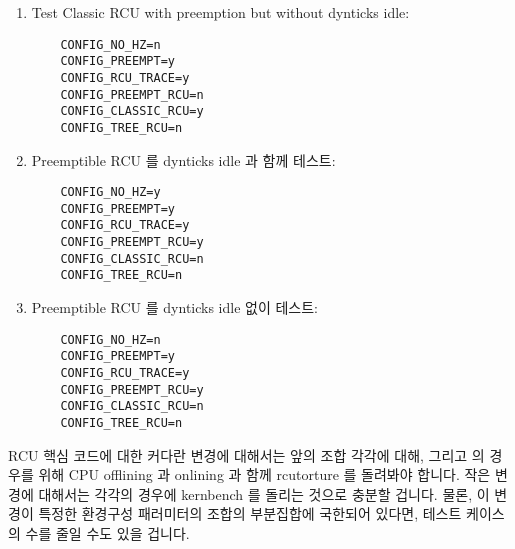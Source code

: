 \begin{enumerate}
\item	Test Classic RCU with preemption but without dynticks idle:
\fi

\vspace{5pt}
\begin{minipage}[t]{\columnwidth}
\scriptsize
\begin{verbatim}
	CONFIG_NO_HZ=n
	CONFIG_PREEMPT=y
	CONFIG_RCU_TRACE=y
	CONFIG_PREEMPT_RCU=n
	CONFIG_CLASSIC_RCU=y
	CONFIG_TREE_RCU=n
\end{verbatim}
\end{minipage}
\vspace{5pt}

\item	Preemptible RCU 를 dynticks idle 과 함께 테스트:
\iffalse

\item	Test Preemptible RCU with dynticks idle:
\fi

\vspace{5pt}
\begin{minipage}[t]{\columnwidth}
\scriptsize
\begin{verbatim}
	CONFIG_NO_HZ=y
	CONFIG_PREEMPT=y
	CONFIG_RCU_TRACE=y
	CONFIG_PREEMPT_RCU=y
	CONFIG_CLASSIC_RCU=n
	CONFIG_TREE_RCU=n
\end{verbatim}
\end{minipage}
\vspace{5pt}
\item	Preemptible RCU 를 dynticks idle 없이 테스트:
\iffalse

\item	Test Preemptible RCU without dynticks idle:
\fi

\vspace{5pt}

\begin{minipage}[t]{\columnwidth}
\scriptsize
\begin{verbatim}
	CONFIG_NO_HZ=n
	CONFIG_PREEMPT=y
	CONFIG_RCU_TRACE=y
	CONFIG_PREEMPT_RCU=y
	CONFIG_CLASSIC_RCU=n
	CONFIG_TREE_RCU=n
\end{verbatim}
\end{minipage}
\vspace{5pt}
\end{enumerate}

RCU 핵심 코드에 대한 커다란 변경에 대해서는 앞의 조합 각각에 대해, 그리고
 의 경우를 위해 CPU offlining 과 onlining 과 함께
rcutorture 를 돌려봐야 합니다.
작은 변경에 대해서는 각각의 경우에 kernbench 를 돌리는 것으로 충분할 겁니다.
물론, 이 변경이 특정한 환경구성 패러미터의 조합의 부분집합에 국한되어 있다면,
테스트 케이스의 수를 줄일 수도 있을 겁니다.

